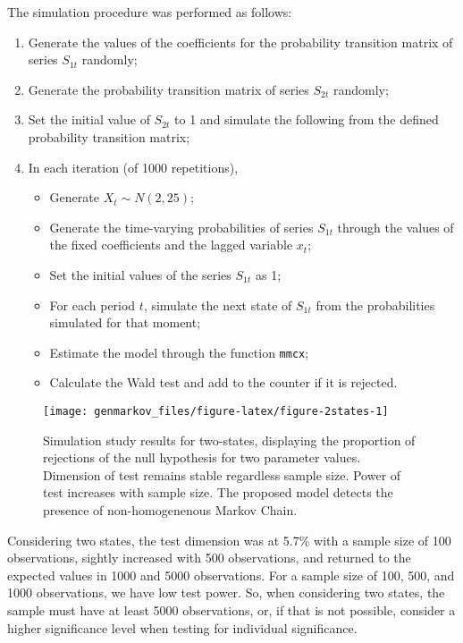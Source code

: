 The simulation procedure was performed as follows:

\begin{enumerate}
\def\labelenumi{\arabic{enumi}.}
\tightlist
\item
  Generate the values of the coefficients for the probability transition matrix of series \(S_{1t}\) randomly;
\item
  Generate the probability transition matrix of series \(S_{2t}\) randomly;
\item
  Set the initial value of \(S_{2t}\) to 1 and simulate the following from the defined probability transition matrix;
\item
  In each iteration (of 1000 repetitions),

  \begin{itemize}
  \tightlist
  \item
    Generate \(X_t \sim N(2,25)\);
  \item
    Generate the time-varying probabilities of series \(S_{1t}\) through the values of the fixed coefficients and the lagged variable \(x_t\);
  \item
    Set the initial values of the series \(S_{1t}\) as 1;
  \item
    For each period \(t\), simulate the next state of \(S_{1t}\) from the probabilities simulated for that moment;
  \item
    Estimate the model through the function \texttt{mmcx};
  \item
    Calculate the Wald test and add to the counter if it is rejected.
  \end{itemize}
\end{enumerate}

\begin{figure}

{\centering \texttt{[image: genmarkov\_files/figure-latex/figure-2states-1]} 

}

\caption{Simulation study results for two-states, displaying the proportion of rejections of the null hypothesis for two parameter values. Dimension of test remains stable regardless sample size. Power of test increases with sample size. The proposed model detects the presence of non-homogenenous Markov Chain.}\label{fig:figure-2states}
\end{figure}

Considering two states, the test dimension was at 5.7\% with a sample size of 100 observations, sightly increased with 500 observations, and returned to the expected values in 1000 and 5000 observations. For a sample size of 100, 500, and 1000 observations, we have low test power. So, when considering two states, the sample must have at least 5000 observations, or, if that is not possible, consider a higher significance level when testing for individual significance.

